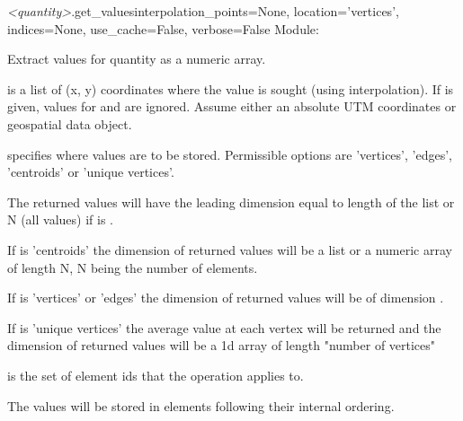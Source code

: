 \documentclass{manual}
\begin{document}
\begin{methoddesc}{\emph{<quantity>}.get_values}{interpolation_points=None,
                   location='vertices',
                   indices=None,
                   use_cache=False,
                   verbose=False}
\label{pg:get values}
Module: 

Extract values for quantity as a numeric array.

 is a list of (x, y) coordinates where the value is
sought (using interpolation). If  is given, values
for  and  are ignored.
Assume either an absolute UTM coordinates or geospatial data object.

 specifies where values are to be stored.
Permissible options are 'vertices', 'edges', 'centroids' or 'unique vertices'.

The returned values will have the leading dimension equal to length of the  list or
N (all values) if  is .

If  is 'centroids' the dimension of returned
values will be a list or a numeric array of length N, N being
the number of elements.

If  is 'vertices' or 'edges' the dimension of
returned values will be of dimension .

If  is 'unique vertices' the average value at
each vertex will be returned and the dimension of returned values
will be a 1d array of length "number of vertices"

 is the set of element ids that the operation applies to.

The values will be stored in elements following their internal ordering.
\end{methoddesc}
\end{document}
